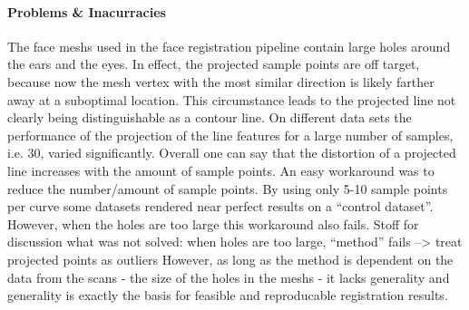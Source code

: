 \paragraph{Problems \& Inacurracies}
The face meshs used in the face registration pipeline contain large holes around the ears and the eyes. In effect, the projected sample points are off target, because now the mesh vertex with the most similar direction is likely farther away at a suboptimal location. This circumstance leads to the projected line not clearly being distinguishable as a contour line. On different data sets the performance of the projection of the line features for a large number of
samples, i.e. 30, varied significantly. Overall one can say that the distortion of a projected line increases with the amount of sample points.
An easy workaround was to reduce the number/amount of sample points. By using only 5-10 sample points per curve some datasets rendered near perfect results on a ``control dataset''.  
However, when the holes are too large this workaround also fails. Stoff for discussion
what was not solved: when holes are too large, ``method'' fails --> treat projected points as outliers 
However, as long as the method is dependent on the data from the scans - the size of the holes in the meshs - it lacks generality and generality is exactly the basis for feasible and reproducable registration results.

